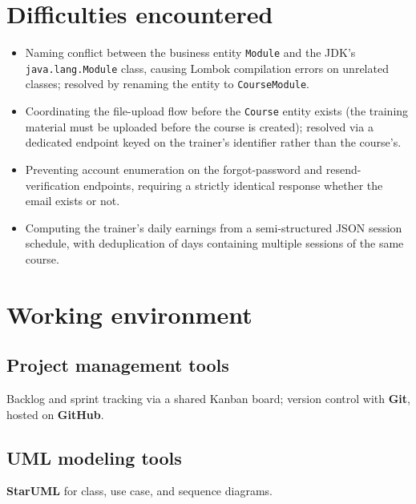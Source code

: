 \documentclass[a4paper,12pt]{report}
\begin{document}
\section{Difficulties encountered}
\begin{itemize}[leftmargin=*]
  \item Naming conflict between the business entity \texttt{Module} and
        the JDK's \texttt{java.lang.Module} class, causing Lombok
        compilation errors on unrelated classes; resolved by renaming the
        entity to \texttt{CourseModule}.
  \item Coordinating the file-upload flow before the \texttt{Course}
        entity exists (the training material must be uploaded before the
        course is created); resolved via a dedicated endpoint keyed on the
        trainer's identifier rather than the course's.
  \item Preventing account enumeration on the forgot-password and
        resend-verification endpoints, requiring a strictly identical
        response whether the email exists or not.
  \item Computing the trainer's daily earnings from a semi-structured JSON
        session schedule, with deduplication of days containing multiple
        sessions of the same course.
\end{itemize}

\section{Working environment}

\subsection{Project management tools}
Backlog and sprint tracking via a shared Kanban board; version control
with \textbf{Git}, hosted on \textbf{GitHub}.

\subsection{UML modeling tools}
\textbf{StarUML} for class, use case, and sequence diagrams.
\end{document}
